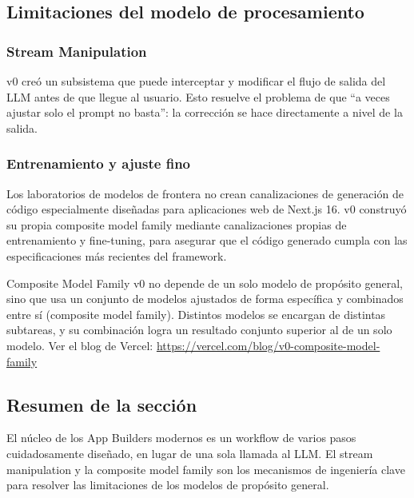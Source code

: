 \subsection{Limitaciones del modelo de procesamiento}

\subsubsection{Stream Manipulation}

v0 creó un subsistema que puede interceptar y modificar el flujo de salida del LLM antes de que llegue al usuario. Esto resuelve el problema de que ``a veces ajustar solo el prompt no basta'': la corrección se hace directamente a nivel de la salida.

\subsubsection{Entrenamiento y ajuste fino}

Los laboratorios de modelos de frontera no crean canalizaciones de generación de código especialmente diseñadas para aplicaciones web de Next.js 16. v0 construyó su propia composite model family mediante canalizaciones propias de entrenamiento y fine-tuning, para asegurar que el código generado cumpla con las especificaciones más recientes del framework.

\begin{knowledgebox}{Composite Model Family}
v0 no depende de un solo modelo de propósito general, sino que usa un conjunto de modelos ajustados de forma específica y combinados entre sí (composite model family). Distintos modelos se encargan de distintas subtareas, y su combinación logra un resultado conjunto superior al de un solo modelo. Ver el blog de Vercel: \url{https://vercel.com/blog/v0-composite-model-family}
\end{knowledgebox}

\subsection{Resumen de la sección}

El núcleo de los App Builders modernos es un workflow de varios pasos cuidadosamente diseñado, en lugar de una sola llamada al LLM. El stream manipulation y la composite model family son los mecanismos de ingeniería clave para resolver las limitaciones de los modelos de propósito general.
